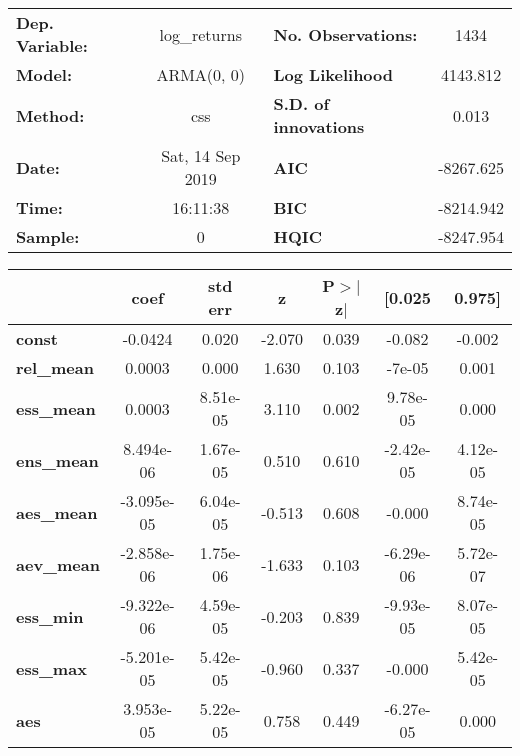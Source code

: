 \begin{center}
\begin{tabular}{lclc}
\toprule
\textbf{Dep. Variable:} &   log\_returns   & \textbf{  No. Observations:  } &    1434     \\
\textbf{Model:}         &    ARMA(0, 0)    & \textbf{  Log Likelihood     } &  4143.812   \\
\textbf{Method:}        &       css        & \textbf{  S.D. of innovations} &   0.013     \\
\textbf{Date:}          & Sat, 14 Sep 2019 & \textbf{  AIC                } & -8267.625   \\
\textbf{Time:}          &     16:11:38     & \textbf{  BIC                } & -8214.942   \\
\textbf{Sample:}        &        0         & \textbf{  HQIC               } & -8247.954   \\
\bottomrule
\end{tabular}
\begin{tabular}{lcccccc}
                   & \textbf{coef} & \textbf{std err} & \textbf{z} & \textbf{P$> |$z$|$} & \textbf{[0.025} & \textbf{0.975]}  \\
\midrule
\textbf{const}     &      -0.0424  &        0.020     &    -2.070  &         0.039        &       -0.082    &       -0.002     \\
\textbf{rel\_mean} &       0.0003  &        0.000     &     1.630  &         0.103        &       -7e-05    &        0.001     \\
\textbf{ess\_mean} &       0.0003  &     8.51e-05     &     3.110  &         0.002        &     9.78e-05    &        0.000     \\
\textbf{ens\_mean} &    8.494e-06  &     1.67e-05     &     0.510  &         0.610        &    -2.42e-05    &     4.12e-05     \\
\textbf{aes\_mean} &   -3.095e-05  &     6.04e-05     &    -0.513  &         0.608        &       -0.000    &     8.74e-05     \\
\textbf{aev\_mean} &   -2.858e-06  &     1.75e-06     &    -1.633  &         0.103        &    -6.29e-06    &     5.72e-07     \\
\textbf{ess\_min}  &   -9.322e-06  &     4.59e-05     &    -0.203  &         0.839        &    -9.93e-05    &     8.07e-05     \\
\textbf{ess\_max}  &   -5.201e-05  &     5.42e-05     &    -0.960  &         0.337        &       -0.000    &     5.42e-05     \\
\textbf{aes}       &    3.953e-05  &     5.22e-05     &     0.758  &         0.449        &    -6.27e-05    &        0.000     \\
\bottomrule
\end{tabular}
\end{center}
